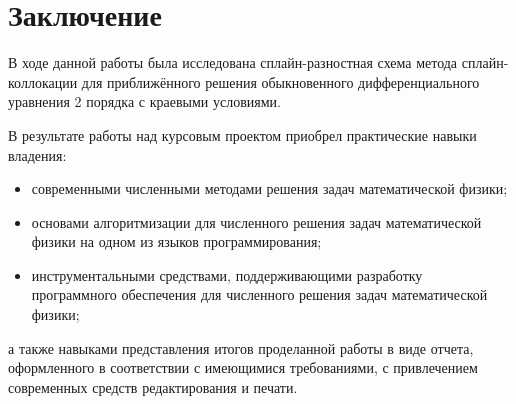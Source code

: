 \section{Заключение}

В ходе данной работы была исследована сплайн-разностная схема метода сплайн-коллокации для приближённого решения обыкновенного дифференциального уравнения 2 порядка с краевыми условиями. 
 
В результате работы над курсовым проектом приобрел практические навыки владения:
\begin{itemize}
    \item современными численными методами решения задач математической физики;
    \item основами алгоритмизации для численного решения задач математической физики на одном из языков программирования;
    \item инструментальными средствами, поддерживающими разработку программного обеспечения для численного решения задач математической физики;
\end{itemize}
а также навыками представления итогов проделанной работы в виде отчета, оформленного в соответствии с имеющимися требованиями, с привлечением современных средств редактирования и печати.
